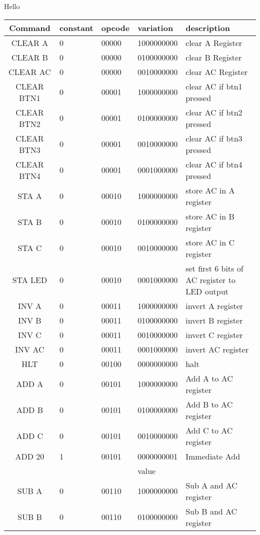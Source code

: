 \documentclass[a4paper]{article}
\begin{document}
Hello
\begin{table}[h]
\centering
\begin{tabular}{|c|l|l|l|p{6cm}|}
\hline
\textbf{Command} & constant & opcode & variation & description \\ \hline
CLEAR A & 0 & 00000 & 1000000000 & clear A Register \\ \hline
CLEAR B & 0 & 00000 & 0100000000 & clear B Register\\ \hline
CLEAR AC & 0 & 00000 & 0010000000 & clear AC Register\\ \hline
CLEAR BTN1 & 0 & 00001 & 1000000000 & clear AC if btn1 pressed\\ \hline
CLEAR BTN2 & 0 & 00001 & 0100000000 & clear AC if btn2 pressed\\ \hline
CLEAR BTN3 & 0 & 00001 & 0010000000 & clear AC if btn3 pressed\\ \hline
CLEAR BTN4 & 0 & 00001 & 0001000000 & clear AC if btn4 pressed\\ \hline
STA A & 0 & 00010 & 1000000000 & store AC in A register\\ \hline
STA B & 0 & 00010 & 0100000000 & store AC in B register\\ \hline
STA C & 0 & 00010 & 0010000000 & store AC in C register\\ \hline
STA LED & 0 & 00010 & 0001000000 & set first 6 bits of AC register to LED output\\ \hline
INV A & 0 & 00011 & 1000000000 & invert A register\\ \hline
INV B & 0 & 00011 & 0100000000 & invert B register\\ \hline
INV C & 0 & 00011 & 0010000000 & invert C register\\ \hline
INV AC & 0 & 00011 & 0001000000 & invert AC register\\ \hline
HLT & 0 & 00100 & 0000000000 & halt\\ \hline
ADD A & 0 & 00101 & 1000000000 & Add A to AC register\\ \hline
ADD B & 0 & 00101 & 0100000000 & Add B to AC register\\ \hline
ADD C & 0 & 00101 & 0010000000 & Add C to AC register\\ \hline
ADD 20 & 1 & 00101 & 0000000001 & Immediate Add \\ 
&  &  & value  & \\ \hline
SUB A & 0 & 00110 & 1000000000 & Sub A and AC register\\ \hline
SUB B & 0 & 00110 & 0100000000 & Sub B and AC register\\ \hline

\end{tabular}
\end{table}
\end{document}
